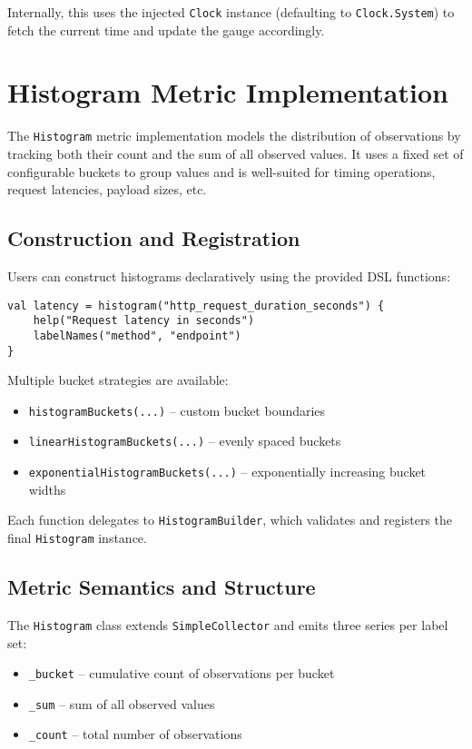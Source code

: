 Internally, this uses the injected \texttt{Clock} instance (defaulting to \texttt{Clock.System}) to fetch the current time and update the gauge accordingly.




\section{Histogram Metric Implementation}

The \texttt{Histogram} metric implementation models the distribution of observations by tracking both their count and the sum of all observed values. It uses a fixed set of configurable buckets to group values and is well-suited for timing operations, request latencies, payload sizes, etc.

\subsection{Construction and Registration}

Users can construct histograms declaratively using the provided DSL functions:

\begin{verbatim}
val latency = histogram("http_request_duration_seconds") {
    help("Request latency in seconds")
    labelNames("method", "endpoint")
}
\end{verbatim}

Multiple bucket strategies are available:
\begin{itemize}
    \item \texttt{histogramBuckets(...)} – custom bucket boundaries
    \item \texttt{linearHistogramBuckets(...)} – evenly spaced buckets
    \item \texttt{exponentialHistogramBuckets(...)} – exponentially increasing bucket widths
\end{itemize}

Each function delegates to \texttt{HistogramBuilder}, which validates and registers the final \texttt{Histogram} instance.

\subsection{Metric Semantics and Structure}

The \texttt{Histogram} class extends \texttt{SimpleCollector} and emits three series per label set:
\begin{itemize}
    \item \texttt{\_bucket} – cumulative count of observations per bucket
    \item \texttt{\_sum} – sum of all observed values
    \item \texttt{\_count} – total number of observations
\end{itemize}

